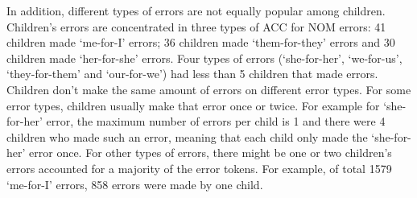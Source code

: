 In addition, different types of errors are not equally popular among children. Children's errors are concentrated in three types of ACC for NOM errors: 41 children made `me-for-I' errors; 36 children made `them-for-they' errors and 30 children made `her-for-she' errors. Four types of errors (`she-for-her', `we-for-us', `they-for-them' and `our-for-we') had less than 5 children that made errors. Children don't make the same amount of errors on different error types. For some error types, children usually make that error once or twice. For example for `she-for-her' error, the maximum number of errors per child is 1 and there were 4 children who made such an error, meaning that each child only made the `she-for-her' error once. For other types of errors, there might be one or two children's errors accounted for a majority of the error tokens. For example, of total 1579 `me-for-I' errors, 858 errors were made by one child. 
 
